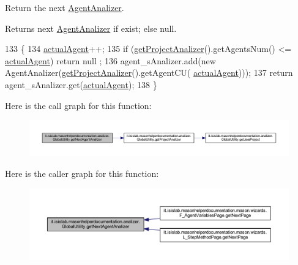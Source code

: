 Return the next \hyperlink{classit_1_1isislab_1_1masonhelperdocumentation_1_1analizer_1_1_agent_analizer}{Agent\-Analizer}. \begin{DoxyReturn}{Returns}
next \hyperlink{classit_1_1isislab_1_1masonhelperdocumentation_1_1analizer_1_1_agent_analizer}{Agent\-Analizer} if exist; else null. 
\end{DoxyReturn}

\begin{DoxyCode}
133                                                       \{
134         \hyperlink{classit_1_1isislab_1_1masonhelperdocumentation_1_1analizer_1_1_global_utility_a8106b6699b9c7834ead4fc38d62a2575}{actualAgent}++;
135         \textcolor{keywordflow}{if} (\hyperlink{classit_1_1isislab_1_1masonhelperdocumentation_1_1analizer_1_1_global_utility_af6bcca0c06ec6fa8c2b2b88f5050914c}{getProjectAnalizer}().getAgentsNum() <= \hyperlink{classit_1_1isislab_1_1masonhelperdocumentation_1_1analizer_1_1_global_utility_a8106b6699b9c7834ead4fc38d62a2575}{actualAgent})    \textcolor{keywordflow}{return} null
      ;
136         agent\_sAnalizer.add(\textcolor{keyword}{new} AgentAnalizer(\hyperlink{classit_1_1isislab_1_1masonhelperdocumentation_1_1analizer_1_1_global_utility_af6bcca0c06ec6fa8c2b2b88f5050914c}{getProjectAnalizer}().getAgentCU(
      \hyperlink{classit_1_1isislab_1_1masonhelperdocumentation_1_1analizer_1_1_global_utility_a8106b6699b9c7834ead4fc38d62a2575}{actualAgent})));
137         \textcolor{keywordflow}{return} agent\_sAnalizer.get(\hyperlink{classit_1_1isislab_1_1masonhelperdocumentation_1_1analizer_1_1_global_utility_a8106b6699b9c7834ead4fc38d62a2575}{actualAgent});     
138     \}
\end{DoxyCode}


Here is the call graph for this function\-:\nopagebreak
\begin{figure}[H]
\begin{center}
\leavevmode
\includegraphics[width=350pt]{classit_1_1isislab_1_1masonhelperdocumentation_1_1analizer_1_1_global_utility_a918557388574cea36be74712ff768d0a_cgraph}
\end{center}
\end{figure}




Here is the caller graph for this function\-:\nopagebreak
\begin{figure}[H]
\begin{center}
\leavevmode
\includegraphics[width=350pt]{classit_1_1isislab_1_1masonhelperdocumentation_1_1analizer_1_1_global_utility_a918557388574cea36be74712ff768d0a_icgraph}
\end{center}
\end{figure}


